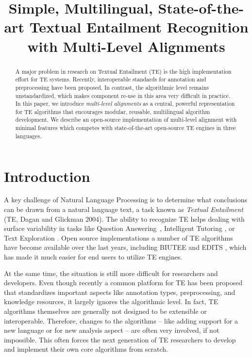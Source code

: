 \documentclass[11pt,a4paper]{article}
\title{Simple, Multilingual, State-of-the-art Textual Entailment
  Recognition with Multi-Level Alignments}
\date{}
\begin{document}
\maketitle
\begin{abstract}
  A major problem in research on Textual Entailment (TE) is the high
  implementation effort for TE systems. Recently, interoperable
  standards for annotation and preprocessing have been proposed. In
  contrast, the algorithmic level remains unstandardized, which
  makes component re-use in this area very difficult in
  practice.
%
%
%
  In this paper, we introduce {\em multi-level alignments} as a
  central, powerful representation for TE algorithms that encourages
  modular, reusable, multilingual algorithm development.
  We describe an open-source implementation of
  multi-level alignment with minimal features which competes with
  state-of-the-art open-source TE engines in three languages.
\end{abstract}

\section{Introduction}
A key challenge of Natural Language Processing is to determine what
conclusions can be drawn from a natural language text, a task known as
\textit{Textual Entailment} (TE, Dagan and Glickman
2004).\nocite{dagan04:_probab_textual_entail} The ability to recognize
TE helps dealing with surface variability in tasks like Question
Answering~\cite{harabagiu-hickl:2006:COLACL}, Intelligent Tutoring
\cite{nielsen09:_recog_entail_in_intel_tutor_system}, or Text
Exploration \cite{berant2012learning}. Open source implementations a
number of TE algorithms have become available over the last years,
including BIUTEE \cite{Stern:2012} and EDITS \cite{Kouylekov:2010},
which has made it much easier for end users to utilize TE engines.

At the same time, the situation is still more difficult for
researchers and developers. Even though recently a common platform for
TE has been proposed \cite{EOP-arch} that standardizes important
aspects like annotation types, preprocessing, and knowledge resources,
it largely ignores the algorithmic level. In fact, TE algorithms
themselves are generally not designed to be extensible or
interoperable. Therefore, changes to the algorithms -- like adding
support for a new language or for new analysis aspect -- are often
very involved, if not impossible. This often forces the next
generation of TE researchers to develop and implement their own core
algorithms from scratch.
\end{document}
